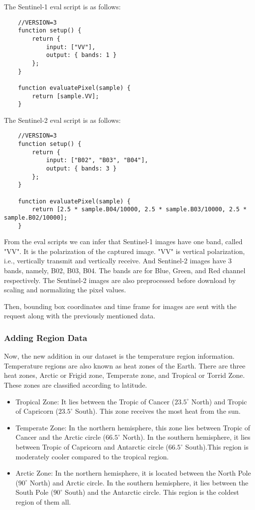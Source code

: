 The Sentinel-1 eval script is as follows:

\begin{lstlisting}
    //VERSION=3
    function setup() {
        return {
            input: ["VV"],
            output: { bands: 1 }
        };
    }

    function evaluatePixel(sample) {
        return [sample.VV];
    }
\end{lstlisting}

The Sentinel-2 eval script is as follows:

\begin{lstlisting}
    //VERSION=3
    function setup() {
        return {
            input: ["B02", "B03", "B04"],
            output: { bands: 3 }
        };
    }

    function evaluatePixel(sample) {
        return [2.5 * sample.B04/10000, 2.5 * sample.B03/10000, 2.5 * sample.B02/10000];
    }
\end{lstlisting}

From the eval scripts we can infer that Sentinel-1 images have one band, called "VV". It is the polarization of the captured image. "VV" is vertical polarization, i.e.,  vertically transmit and vertically receive. And Sentinel-2 images have 3 bands, namely, B02, B03, B04. The bands are for Blue, Green, and Red channel respectively. The Sentinel-2 images are also preprocessed before download by scaling and normalizing the pixel values. 

Then, bounding box coordinates and time frame for images are sent with the request along with the previously mentioned data.

\subsubsection{Adding Region Data}
Now, the new addition in our dataset is the temperature region information. Temperature regions are also known as heat zones of the Earth. There are three heat zones, Arctic or Frigid zone, Temperate zone, and Tropical or Torrid Zone. These zones are classified according to latitude.

\begin{itemize}
    \item Tropical Zone: It lies between the Tropic of Cancer ($23.5^\circ$ North) and Tropic of Capricorn ($23.5^\circ$ South). This zone receives the most heat from the sun.
    \item Temperate Zone: In the northern hemisphere, this zone lies between Tropic of Cancer and the Arctic circle ($66.5^\circ$ North). In the southern hemisphere, it lies between Tropic of Capricorn and Antarctic circle ($66.5^\circ$ South).This region is moderately cooler compared to the tropical region.
    \item Arctic Zone: In the northern hemisphere, it is located between the North Pole ($90^\circ$ North) and Arctic circle. In the southern hemisphere, it lies between the South Pole ($90^\circ$ South) and the Antarctic circle. This region is the coldest region of them all.
\end{itemize}

